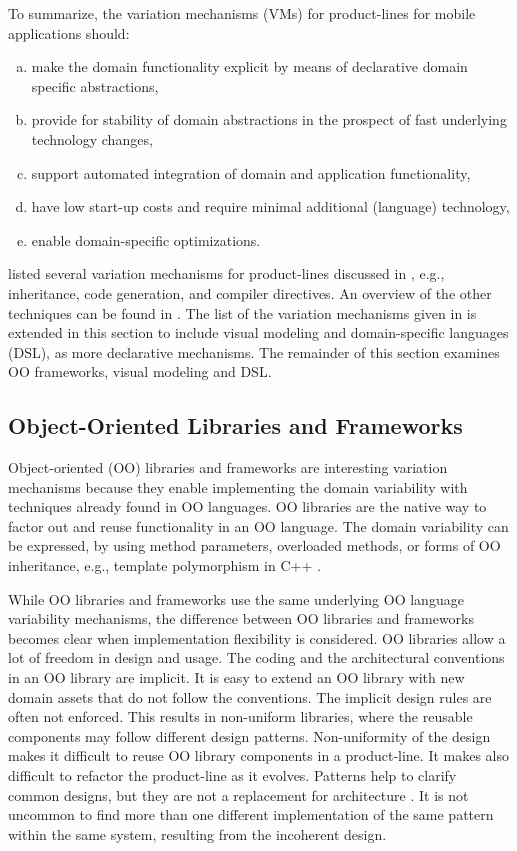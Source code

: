 \noindent To summarize, the variation mechanisms (VMs) for product-lines for mobile applications should:
\begin{enumerate}[a.]
\item make the domain functionality explicit by means of declarative domain specific abstractions,
\item provide for stability of domain abstractions in the prospect of fast underlying technology changes,
\item support automated integration of domain and application functionality,
\item have low start-up costs and require minimal additional (language) technology,
\item enable domain-specific optimizations.
\end{enumerate}

 listed several variation mechanisms for product-lines discussed in \cite{pl.levels.00,pl.00,harsu.2001}, e.g., inheritance, code generation, and compiler directives. An overview of the other techniques can be found in \cite{sf.04}. The list of the variation mechanisms given in \cite{pl.levels.00,pl.00,harsu.2001} is extended in this section to include visual modeling and domain-specific languages (DSL), as more declarative mechanisms. The remainder of this section examines OO frameworks, visual modeling and DSL.

\subsection{Object-Oriented Libraries and Frameworks}
\label{sec:ooframeworks}

Object-oriented (OO) libraries and frameworks are interesting variation mechanisms because they enable implementing the domain variability with techniques already found in OO languages. OO libraries are the native way to factor out and reuse functionality in an OO language. The domain variability can be expressed, by using method parameters, overloaded methods, or forms of OO inheritance, e.g., template polymorphism in C++ \cite{cpp.97}.

While OO libraries and frameworks use the same underlying OO language variability mechanisms, the difference between OO libraries and frameworks becomes clear when implementation flexibility is considered. OO libraries allow a lot of freedom in design and usage. The coding and the architectural conventions in an OO library are implicit. It is easy to extend an OO library with new domain assets that do not follow the conventions. The implicit design rules are often not enforced. This results in non-uniform libraries, where the reusable components may follow different design patterns.  Non-uniformity of the design makes it difficult to reuse OO library components in a product-line. It makes also difficult to refactor the product-line as it evolves. Patterns \cite{dpatterns} help to clarify common designs, but they are not a replacement for architecture \cite{patterns2}. It is not uncommon to find more than one different implementation of the same pattern within the same system, resulting from the incoherent design.

